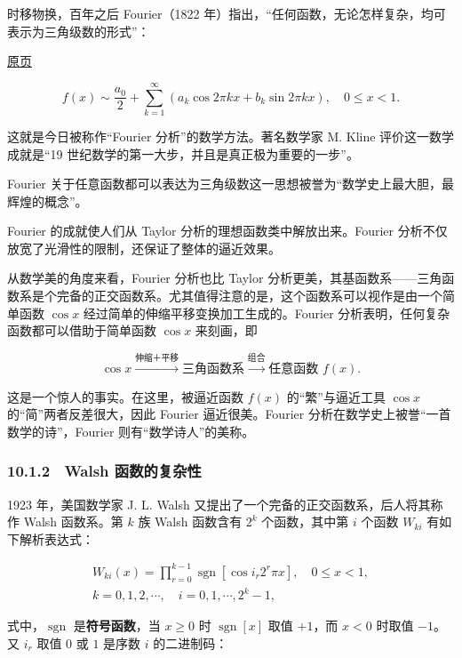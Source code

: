 \documentclass[
  10pt,
  fontset=fandol]{ctexart}
\begin{document}
时移物换，百年之后 Fourier（1822 年）指出，``任何函数，无论怎样复杂，均可表示为三角级数的形式''：

\href{../../source-images/pdf-262.jpeg}{原页}

\[
f(x)\sim\frac{a_0}{2}+\sum_{k=1}^{\infty}(a_k\cos2\pi kx+b_k\sin2\pi kx),\quad 0\leqslant x<1.
\]

这就是今日被称作``Fourier 分析''的数学方法。著名数学家 M. Kline 评价这一数学成就是``19 世纪数学的第一大步，并且是真正极为重要的一步''。

Fourier 关于任意函数都可以表达为三角级数这一思想被誉为``数学史上最大胆，最辉煌的概念''。

Fourier 的成就使人们从 Taylor 分析的理想函数类中解放出来。Fourier 分析不仅放宽了光滑性的限制，还保证了整体的逼近效果。

从数学美的角度来看，Fourier 分析也比 Taylor 分析更美，其基函数系------三角函数系是个完备的正交函数系。尤其值得注意的是，这个函数系可以视作是由一个简单函数 \(\cos x\) 经过简单的伸缩平移变换加工生成的。Fourier 分析表明，任何复杂函数都可以借助于简单函数 \(\cos x\) 来刻画，即

\[
\cos x\xrightarrow{\text{伸缩＋平移}}\text{三角函数系}\xrightarrow{\text{组合}}\text{任意函数 }f(x).
\]

这是一个惊人的事实。在这里，被逼近函数 \(f(x)\) 的``繁''与逼近工具 \(\cos x\) 的``简''两者反差很大，因此 Fourier 逼近很美。Fourier 分析在数学史上被誉``一首数学的诗''，Fourier 则有``数学诗人''的美称。

\subsubsection{10.1.2　Walsh 函数的复杂性}\label{walsh-ux51fdux6570ux7684ux590dux6742ux6027}

1923 年，美国数学家 J. L. Walsh 又提出了一个完备的正交函数系，后人将其称作 Walsh 函数系。第 \(k\) 族 Walsh 函数含有 \(2^k\) 个函数，其中第 \(i\) 个函数 \(W_{ki}\) 有如下解析表达式：

\[
\begin{gathered}
W_{ki}(x)=\prod_{r=0}^{k-1}\operatorname{sgn}[\cos i_r2^r\pi x],\quad 0\leqslant x<1,\\
k=0,1,2,\cdots,\quad i=0,1,\cdots,2^k-1,
\end{gathered}
\]

式中，\(\operatorname{sgn}\) 是\textbf{符号函数}，当 \(x\geqslant0\) 时 \(\operatorname{sgn}[x]\) 取值 \(+1\)，而 \(x<0\) 时取值 \(-1\)。又 \(i_r\) 取值 \(0\) 或 \(1\) 是序数 \(i\) 的二进制码：
\end{document}
